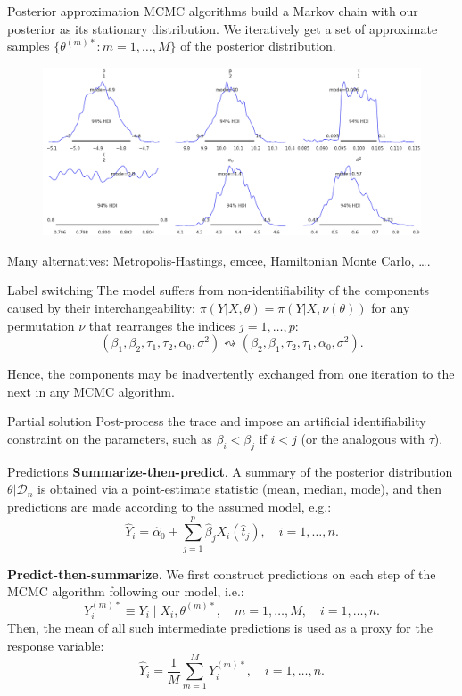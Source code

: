 \documentclass[9pt, english, professionalfonts]{beamer}
\newcommand\maroon[1]{\color{mLightBrown}#1\color{mDarkTeal}}
\newcommand{\D} {\ensuremath{\mathcal{D}}}
\begin{document}
\begin{frame}{Posterior approximation}
 MCMC algorithms build a Markov chain with our posterior as its stationary distribution. We iteratively get a set of approximate samples \(\{\theta^{(m)*}: m=1,\dots, M\}\) of the posterior distribution.

  \begin{figure}
    \centering
    \includegraphics[width=.9\textwidth]{posterior}
  \end{figure}

Many alternatives: Metropolis-Hastings, \maroon{emcee}, Hamiltonian Monte Carlo, \ldots.
\end{frame}

\begin{frame}{Label switching}
The model suffers from non-identifiability of the components caused by their interchangeability: \(\pi(Y|X,\theta)=\pi(Y|X, \nu(\theta))\) for any permutation \(\nu\) that rearranges the indices \(j=1,\dots, p\):
    \[
    (\beta_1, \beta_2, \tau_1, \tau_2, \alpha_0, \sigma^2) \leftrightsquigarrow (\beta_2, \beta_1, \tau_2, \tau_1, \alpha_0, \sigma^2).
  \]

Hence, the components may be inadvertently exchanged from one iteration to the next in any MCMC algorithm.

\vspace{1em}
\begin{alertblock}{Partial solution}
  \vspace{0.25em}
  Post-process the trace and impose an artificial identifiability constraint on the parameters, such as \(\beta_i < \beta_j\) if \(i<j\) (or the analogous with \(\tau\)).
\end{alertblock}
\end{frame}

\begin{frame}{Predictions}
  \textbf{Summarize-then-predict}. A summary of the posterior distribution \(\theta| \D_n\) is obtained via a point-estimate statistic (mean, median, mode), and then predictions are made according to the assumed model, e.g.:
  \[
  \hat Y_i =\hat \alpha_0 + \sum_{j=1}^p \hat \beta_j X_i(\hat t_j), \quad i=1,\dots, n.
  \]

  \textbf{Predict-then-summarize}. We first construct predictions on each step of the MCMC algorithm following our model, i.e.:
  \[
    Y_i^{(m)*} \equiv Y_i \mid X_i, \theta^{(m)*}, \quad m=1,\dots,M, \quad i=1,\dots, n.
  \]
  Then, the mean of all such intermediate predictions is used as a proxy for the response variable:
  \[
    \hat Y_i = \frac{1}{M}\sum_{m=1}^M Y_i^{(m)*}, \quad i=1,\dots, n.
  \]
\end{frame}
\end{document}
